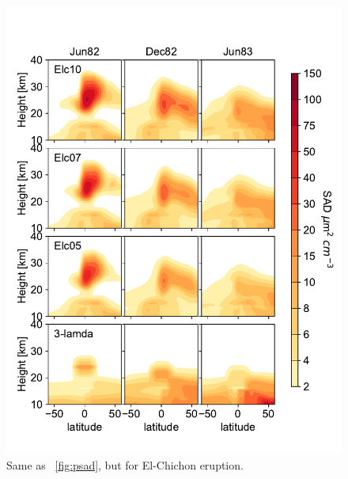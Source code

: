 \documentclass[acpd, hvmath, online]{copernicus_discussions}
\begin{document}
\newpage
\begin{figure}[ht!]
\includegraphics[width=.8\textwidth,height=.9\textheight,trim={0.1cm 0.1cm 0.1cm 0.1cm},clip]{Elc_sad.pdf}
\caption{Same as ~\ref{fig:psad}, but for El-Chichon eruption.} 
\label{fig:esad}
\end{figure}
\end{document}
